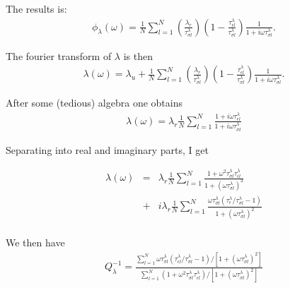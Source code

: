 \documentclass[11pt]{article}
\begin{document}
{The results is:
\begin{eqnarray}
\phi_{\lambda}(\omega)=  \frac{1}{N}\sum_{l=1}^N\left(\frac{\lambda_r}{\tau^{\lambda}_{\sigma l}}\right) 
            \left(1-\frac{\tau^{\lambda}_{\epsilon l}}{\tau^{\lambda}_{\sigma l}} \right)\frac{1}{1+i\omega\tau^{\lambda}_{\sigma l}}.
\end{eqnarray}

The fourier transform of $\lambda$ is then
\begin{eqnarray}
\lambda(\omega) = \lambda_u 
+\frac{1}{N}\sum_{l=1}^N\left(\frac{\lambda_r}{\tau^{\lambda}_{\sigma l}}\right) 
            \left(1-\frac{\tau^{\lambda}_{\epsilon l}}{\tau^{\lambda}_{\sigma l}} \right)\frac{1}{1+i\omega\tau^{\lambda}_{\sigma l}}.
\end{eqnarray}

After some (tedious) algebra one obtains
\begin{eqnarray}
\lambda(\omega) = \lambda_r \frac{1}{N}\sum_{l=1}^N\frac{1+i\omega\tau^{\lambda}_{\epsilon l}}{1+i\omega\tau^{\lambda}_{\sigma l}} 
\end{eqnarray}

Separating into real and imaginary parts, I get

\begin{eqnarray}
\lambda(\omega) & = & \lambda_r 
\frac{1}{N}\sum_{l=1}^N
\frac{1+\omega^2\tau^{\lambda}_{\sigma l}\tau^{\lambda}_{\epsilon l}}
     {1+(\omega\tau^{\lambda}_{\sigma l})^2}  \\\nonumber
                & + & i\lambda_r \frac{1}{N}\sum_{l=1}^N\frac{\omega\tau^{\lambda}_{\sigma l}(\tau^{\lambda}_{\epsilon}/\tau^{\lambda}_{\sigma l}-1)}
                                                              {1+(\omega\tau^{\lambda}_{\sigma l})^2}  \nonumber\\
\end{eqnarray}

We then have
\begin{eqnarray}
Q^{-1}_{\lambda} = \frac{\sum_{l=1}^N {\omega\tau^{\lambda}_{\sigma l}\left(\tau^{\lambda}_{\epsilon l}/\tau^{\lambda}_{\sigma l} -1\right)}
                                           /\left[1 + (\omega\tau^{\lambda}_{\sigma l})^2\right] 
                        }
                        {\sum_{l=1}^N (1 + \omega^2\tau^{\lambda}_{\sigma l}\tau^{\lambda}_{\epsilon l})
                                           /\left[1 + (\omega\tau^{\lambda}_{\sigma l})^2\right]       
                        }
\end{eqnarray}

}
\end{document}

